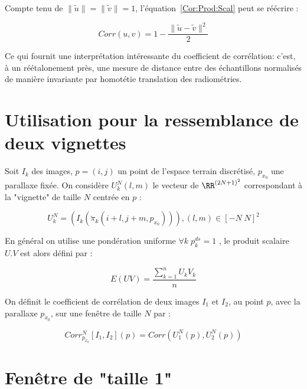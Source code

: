 Compte tenu de  $\|\tilde{u}\|=\|\tilde{v}\|=1 $,
l'\'equation~\ref{Cor:Prod:Scal}  peut se r\'e\'ecrire :


\begin{equation}
   Corr(u,v) =  1-\frac{\|\tilde{u}-\tilde{v}\|^2}{2}
\label{Corr:As:Norme}
\end{equation}

Ce qui fournit une interpr\'etation int\'eressante du coefficient
de corr\'elation: c'est, \`a un r\'e\'etalonement pr\`es, une mesure
de distance entre des \'echantillons normalis\'es de mani\`ere
 invariante par homot\'etie translation des radiom\'etries.


\section{Utilisation pour la ressemblance de  deux vignettes}

\label{Vign:Correl}

Soit $I_k$ des images, $p=(i,j)$ un point de l'espace terrain
discr\'etis\'e, $p_{x_0}$ une parallaxe fix\'ee.
On consid\`ere $U^N_k(l,m)$ le vecteur  de $\RR^{(2N+1)^2}$ correspondant  \`a  la
"vignette" de taille $N$ centr\'ee en $p$ : 


\begin{equation}
   U^N_k = (I_k( \breve\pi_k(i+l,j+m,p_{x_0}))) ,  (l,m) \in [-N \; N] ^2
\end{equation}

En g\'en\'eral on  utilise une pond\'eration uniforme $\forall k \;p^{ds}_k=1$ ,
le produit scalaire $U.V$ est alors d\'efini par :

\begin{equation}
   E(UV) =  \frac{\sum^n_{k=1} U_k V_k}n
\end{equation}


On d\'efinit le coefficient de corr\'elation de deux images $I_1$ et $I_2$,
au point $p$, avec la parallaxe $p_{x_0}$, sur une fen\^etre de taille $N$ par :


\begin{equation}
   Corr^N_{p_{x_0}}[I_1,I_2](p) =   Corr(U^N_1(p),U^N_2(p))
\end{equation}


\section{Fen\^etre de "taille 1"}

